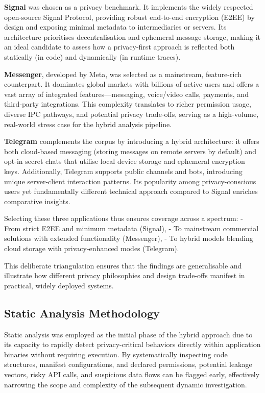 \documentclass[a4paper,12pt]{report}
\begin{document}
\textbf{Signal} was chosen as a privacy benchmark. It implements the widely respected open-source Signal Protocol, providing robust end-to-end encryption (E2EE) by design and exposing minimal metadata to intermediaries or servers. Its architecture prioritises decentralisation and ephemeral message storage, making it an ideal candidate to assess how a privacy-first approach is reflected both statically (in code) and dynamically (in runtime traces).

\textbf{Messenger}, developed by Meta, was selected as a mainstream, feature-rich counterpart. It dominates global markets with billions of active users and offers a vast array of integrated features—messaging, voice/video calls, payments, and third-party integrations. This complexity translates to richer permission usage, diverse IPC pathways, and potential privacy trade-offs, serving as a high-volume, real-world stress case for the hybrid analysis pipeline.

\textbf{Telegram} complements the corpus by introducing a hybrid architecture: it offers both cloud-based messaging (storing messages on remote servers by default) and opt-in secret chats that utilise local device storage and ephemeral encryption keys. Additionally, Telegram supports public channels and bots, introducing unique server-client interaction patterns. Its popularity among privacy-conscious users yet fundamentally different technical approach compared to Signal enriches comparative insights.

Selecting these three applications thus ensures coverage across a spectrum:
- From strict E2EE and minimum metadata (Signal),
- To mainstream commercial solutions with extended functionality (Messenger),
- To hybrid models blending cloud storage with privacy-enhanced modes (Telegram).

This deliberate triangulation ensures that the findings are generalisable and illustrate how different privacy philosophies and design trade-offs manifest in practical, widely deployed systems.

\subsection{Static Analysis Methodology}

Static analysis was employed as the initial phase of the hybrid approach due to its capacity to rapidly detect privacy-critical behaviors directly within application binaries without requiring execution. By systematically inspecting code structures, manifest configurations, and declared permissions, potential leakage vectors, risky API calls, and suspicious data flows can be flagged early, effectively narrowing the scope and complexity of the subsequent dynamic investigation.
\end{document}
